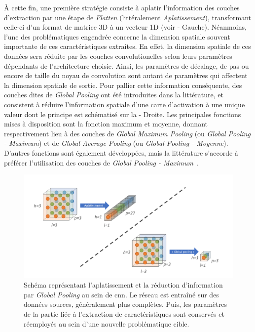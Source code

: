 À cette fin, une première stratégie consiste à aplatir l'information des couches d'extraction par une étape de \textit{Flatten} (littéralement \textit{Aplatissement}), transformant celle-ci d'un format de matrice 3D à un vecteur 1D (voir  - Gauche). Néanmoins, l'une des problématiques engendrée concerne la dimension spatiale souvent importante de ces caractéristiques extraites. En effet, la dimension spatiale de ces données sera réduite par les couches convolutionelles selon leurs paramètres dépendants de l'architecture choisie. Ainsi, les paramètres de décalage, de pas ou encore de taille du noyau de convolution sont autant de paramètres qui affectent la dimension spatiale de sortie. Pour pallier cette information conséquente, des couches dites de \textit{Global Pooling} ont été introduites dans la littérature, et consistent à réduire l'information spatiale d'une carte d'activation à une unique valeur dont le principe est schématisé sur la  - Droite. Les principales fonctions mises à disposition sont la fonction maximum et moyenne, donnant respectivement lieu à des couches de \textit{Global Maximum Pooling} (ou \textit{Global Pooling - Maximum}) et de \textit{Global Average Pooling} (ou \textit{Global Pooling - Moyenne}). D'autres fonctions sont également développées, mais la littérature s'accorde à préférer l'utilisation des couches de \textit{Global Pooling - Maximum}~\cite{christlein2019}.\par

\begin{figure}[H]
    \centering
    \includegraphics[width=\linewidth]{contents/chapter_5/resources/scheme_global_pooling.pdf}
    \caption{Schéma représentant l'aplatissement et la réduction d'information par \textit{Global Pooling} au sein de \gls{cnn}. Le réseau est entraîné sur des données sources, généralement plus complètes. Puis, les paramètres de la partie liée à l'extraction de caractéristiques sont conservés et réemployés au sein d'une nouvelle problématique cible.}
    \label{fig:scheme_global_pooling}
\end{figure}\par

